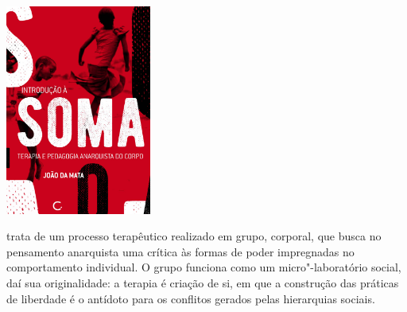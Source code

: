 \begin{center}
\hspace*{-4cm}
\hspace*{4cm}\includegraphics[width=48mm]{./imgs/soma.jpg}
\end{center}

\hspace*{-7cm}\hrulefill\hspace*{-7cm}

\medskip

 trata de um processo terapêutico realizado em grupo, corporal, que busca no pensamento anarquista uma crítica às formas de poder impregnadas no comportamento individual. O grupo funciona como um micro"-laboratório social, daí sua originalidade: a terapia é criação de si, em que a construção das práticas de liberdade é o antídoto para os conflitos gerados pelas hierarquias sociais.

\vfill

\hspace*{-.4cm}\begin{minipage}[c]{1\linewidth}
\small{
{}}
\end{minipage}

\pagebreak
\pagestyle{circuitocat}


